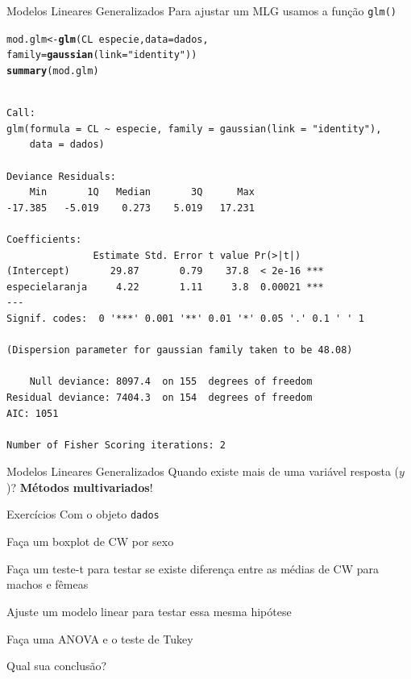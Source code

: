\documentclass[10pt]{beamer}\usepackage[]{graphicx}\usepackage[]{color}
\makeatletter
\newcommand{\hlstr}[1]{\textcolor[rgb]{0.192,0.494,0.8}{#1}}%
\newcommand{\hlopt}[1]{\textcolor[rgb]{0,0,0}{#1}}%
\newcommand{\hlstd}[1]{\textcolor[rgb]{0.345,0.345,0.345}{#1}}%
\newcommand{\hlkwb}[1]{\textcolor[rgb]{0.69,0.353,0.396}{#1}}%
\newcommand{\hlkwc}[1]{\textcolor[rgb]{0.333,0.667,0.333}{#1}}%
\newcommand{\hlkwd}[1]{\textcolor[rgb]{0.737,0.353,0.396}{\textbf{#1}}}%
\newenvironment{kframe}{%
 \def\at@end@of@kframe{}%
 \ifinner\ifhmode%
  \def\at@end@of@kframe{\end{minipage}}%
  \begin{minipage}{\columnwidth}%
 \fi\fi%
 \def\FrameCommand##1{\hskip\@totalleftmargin \hskip-\fboxsep
 \colorbox{shadecolor}{##1}\hskip-\fboxsep
     \hskip-\linewidth \hskip-\@totalleftmargin \hskip\columnwidth}%
 \MakeFramed {\advance\hsize-\width
   \@totalleftmargin\z@ \linewidth\hsize
   \@setminipage}}%
 {\par\unskip\endMakeFramed%
 \at@end@of@kframe}
\newenvironment{knitrout}{}{} %
\theoremstyle{definition}
\makeatother
\begin{document}
\begin{frame}[fragile=singleslide]{Modelos Lineares Generalizados}
Para ajustar um MLG usamos a função \texttt{glm()}
\begin{knitrout}\footnotesize
{}\color{fgcolor}\begin{kframe}
\begin{alltt}
\hlstd{mod.glm} \hlkwb{<-} \hlkwd{glm}\hlstd{(CL} \hlopt{~} \hlstd{especie,} \hlkwc{data} \hlstd{= dados,}
               \hlkwc{family} \hlstd{=} \hlkwd{gaussian}\hlstd{(}\hlkwc{link} \hlstd{=} \hlstr{"identity"}\hlstd{))}
\hlkwd{summary}\hlstd{(mod.glm)}
\end{alltt}
\begin{verbatim}

Call:
glm(formula = CL ~ especie, family = gaussian(link = "identity"), 
    data = dados)

Deviance Residuals: 
    Min       1Q   Median       3Q      Max  
-17.385   -5.019    0.273    5.019   17.231  

Coefficients:
               Estimate Std. Error t value Pr(>|t|)    
(Intercept)       29.87       0.79    37.8  < 2e-16 ***
especielaranja     4.22       1.11     3.8  0.00021 ***
---
Signif. codes:  0 '***' 0.001 '**' 0.01 '*' 0.05 '.' 0.1 ' ' 1

(Dispersion parameter for gaussian family taken to be 48.08)

    Null deviance: 8097.4  on 155  degrees of freedom
Residual deviance: 7404.3  on 154  degrees of freedom
AIC: 1051

Number of Fisher Scoring iterations: 2
\end{verbatim}
\end{kframe}
\end{knitrout}
\end{frame}

\begin{frame}[fragile=singleslide]{Modelos Lineares Generalizados}
Quando existe mais de uma variável resposta ($y$)? \textbf{Métodos
  multivariados}!
\end{frame}

\begin{frame}[fragile=singleslide]{Exercícios}
Com o objeto \texttt{dados}
\begin{compactenum}[(1)]
\item Faça um boxplot de CW por sexo
\item Faça um teste-t para testar se existe diferença entre as médias de
  CW para machos e fêmeas
\item Ajuste um modelo linear para testar essa mesma hipótese
\item Faça uma ANOVA e o teste de Tukey
\end{compactenum}
Qual sua conclusão?
\end{frame}
\end{document}
